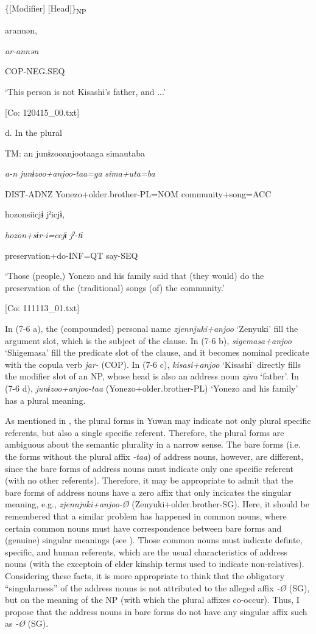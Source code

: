           \{[Modifier]  [Head]\}\textsubscript{NP}

      arannən,

      \textit{ar-annən}

      COP-NEG.SEQ

      ‘This person is not Kisashi’s father, and ...’

      [Co: 120415\_00.txt]

  d.  In the plural

    TM:  an  junɨzooanjootaaga  simautaba

      \textit{a-n}  \textit{junɨzoo+anjoo-taa=ga}  \textit{sima+uta=ba}

      DIST-ADNZ  Yonezo+older.brother-PL=NOM  community+song=ACC

      hozonsiicjɨ  jˀicjɨ,

      \textit{hozon+sɨr-i=ccjɨ}  \textit{jˀ-tɨ}

      preservation+do-INF=QT  say-SEQ

      ‘Those (people,) Yonezo and his family said that (they would) do the preservation of the (traditional) songs (of) the community.’

      [Co: 111113\_01.txt]

In (7-6 a), the (compounded) personal name \textit{zjennjuki+anjoo} ‘Zenyuki’ fill the argument slot, which is the subject of the clause. In (7-6 b), \textit{sigemasa+anjoo} ‘Shigemasa’ fill the predicate slot of the clause, and it becomes nominal predicate with the copula verb \textit{jar-} (COP). In (7-6 c), \textit{kisasi+anjoo} ‘Kisashi’ directly fills the modifier slot of an NP, whose head is also an address noun \textit{zjuu} ‘father’. In (7-6 d), \textit{junɨzoo+anjoo-taa} (Yonezo+older.brother-PL) ‘Yonezo and his family’ has a plural meaning.

  As mentioned in , the plural forms in Yuwan may indicate not only plural specific referents, but also a single specific referent. Therefore, the plural forms are ambiguous about the semantic plurality in a narrow sense. The bare forms (i.e. the forms without the plural affix \textit{{}-taa}) of address nouns, however, are different, since the bare forms of address nouns must indicate only one specific referent (with no other referents). Therefore, it may be appropriate to admit that the bare forms of address nouns have a zero affix that only incicates the singular meaning, e.g., \textit{zjennjuki+anjoo-Ø} (Zenyuki+older.brother-SG). Here, it should be remembered that a similar problem has happened in common nouns, where certain common nouns must have correspondence between bare forms and (genuine) singular meanings (see ). Those common nouns must indicate definte, specific, and human referents, which are the usual characteristics of address nouns (with the exceptoin of elder kinship terms used to indicate non-relatives). Considering these facts, it is more appropriate to think that the obligatory “singularness” of the address nouns is not attributed to the alleged affix \textit{{}-Ø} (SG), but on the meaning of the NP (with which the plural affixes co-occur). Thus, I propose that the address nouns in bare forms do not have any singular affix such as \textit{{}-Ø} (SG).

